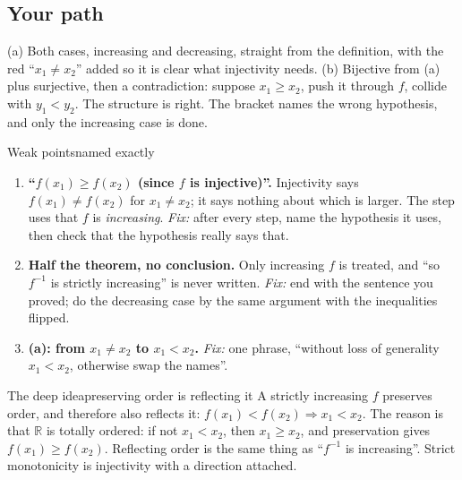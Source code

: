 \documentclass{kaelearn}
\begin{document}
\subsection{Your path}
(a) Both cases, increasing and decreasing, straight from the definition, with the red ``$x_1\neq x_2$'' added so it
is clear what injectivity needs. (b) Bijective from (a) plus surjective, then a contradiction: suppose $x_1\ge x_2$,
push it through $f$, collide with $y_1<y_2$. The structure is right. The bracket names the wrong hypothesis, and only
the increasing case is done.

\begin{panel}[unbreakable]{Weak points}{named exactly}{}
\begin{enumerate}
  \item \textbf{``$f(x_1)\ge f(x_2)$ (since $f$ is injective)''.} Injectivity says $f(x_1)\neq f(x_2)$ for
        $x_1\neq x_2$; it says nothing about which is larger. The step uses that $f$ is \emph{increasing}.
        \emph{Fix:} after every step, name the hypothesis it uses, then check that the hypothesis really says that.
  \item \textbf{Half the theorem, no conclusion.} Only increasing $f$ is treated, and ``so $f^{-1}$ is strictly
        increasing'' is never written. \emph{Fix:} end with the sentence you proved; do the decreasing case by the
        same argument with the inequalities flipped.
  \item \textbf{(a): from $x_1\neq x_2$ to $x_1<x_2$.} \emph{Fix:} one phrase, ``without loss of generality
         $x_1<x_2$, otherwise swap the names''.
\end{enumerate}
\end{panel}

\begin{panel}[unbreakable]{The deep idea}{preserving order is reflecting it}{}
A strictly increasing $f$ preserves order, and therefore also reflects it: $f(x_1)<f(x_2)\Rightarrow x_1<x_2$. The
reason is that $\mathbb{R}$ is totally ordered: if not $x_1<x_2$, then $x_1\ge x_2$, and preservation gives
$f(x_1)\ge f(x_2)$. Reflecting order is the same thing as ``$f^{-1}$ is increasing''. Strict monotonicity is
injectivity with a direction attached.
\end{panel}
\end{document}
